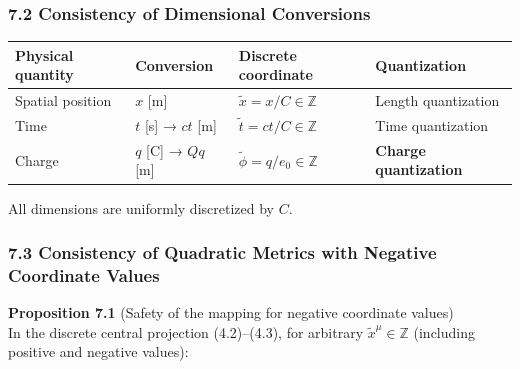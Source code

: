 \documentclass[a4paper,11pt]{article}
\theoremstyle{definition}
\begin{document}
\subsubsection{7.2 Consistency of Dimensional Conversions}\label{consistency-of-dimensional-conversions}

{\def\LTcaptype{none} %
\begin{longtable}[]{@{}
  >{\raggedright\arraybackslash}p{}
  >{\raggedright\arraybackslash}p{}
  >{\raggedright\arraybackslash}p{}
  >{\raggedright\arraybackslash}p{}@{}}
\toprule\noalign{}
\begin{minipage}[b]{\linewidth}\raggedright
Physical quantity
\end{minipage} & \begin{minipage}[b]{\linewidth}\raggedright
Conversion
\end{minipage} & \begin{minipage}[b]{\linewidth}\raggedright
Discrete coordinate
\end{minipage} & \begin{minipage}[b]{\linewidth}\raggedright
Quantization
\end{minipage} \\
\midrule\noalign{}
\endhead
\bottomrule\noalign{}
\endlastfoot
Spatial position & \(x\) {[}m{]} & \(\tilde{x} = x/C \in \mathbb{Z}\) & Length quantization \\
Time & \(t\) {[}s{]} → \(ct\) {[}m{]} & \(\tilde{t} = ct/C \in \mathbb{Z}\) & Time quantization \\
Charge & \(q\) {[}C{]} → \(Qq\) {[}m{]} & \(\tilde{\phi} = q/e_0 \in \mathbb{Z}\) & \textbf{Charge quantization} \\
\end{longtable}
}

All dimensions are uniformly discretized by \(C\).

\subsubsection{7.3 Consistency of Quadratic Metrics with Negative Coordinate Values}\label{consistency-of-quadratic-metrics-with-negative-coordinate-values}

\textbf{Proposition 7.1} (Safety of the mapping for negative coordinate values)\\
In the discrete central projection (4.2)--(4.3), for arbitrary \(\tilde{x}^\mu \in \mathbb{Z}\) (including positive and negative values):
\end{document}
